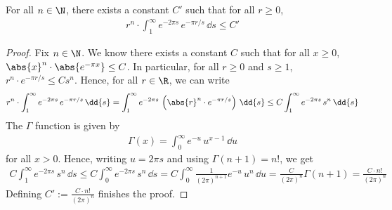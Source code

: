 \begin{lemma}\label{lem:integral-bound}\leanok
    For all $n \in \N$, there exists a constant $C'$ such that for all $r \geq 0$,
    \begin{align}
        r^n \cdot \int_{1}^{\infty} e^{-2\pi s} \, e^{-\pi r /s} \, \dd s \leq C'
    \end{align}
\end{lemma}
\begin{proof}\leanok
    Fix $n \in \N$. We know there exists a constant $C$ such that for all $x \geq 0$, $\abs{x}^n \cdot \abs{e^{-\pi x}} \leq C$. In particular, for all $r \geq 0$ and $s \geq 1$, $r^n \cdot e^{-\pi r/s} \leq C s^n$. Hence, for all $r \in \R$, we can write
    \begin{align}
        r^n \cdot \int_{1}^{\infty} e^{-2\pi s} \, e^{-\pi r /s} \, \dd{s}
        = \int_{1}^{\infty} e^{-2\pi s} \, \left(\abs{r}^n \cdot e^{-\pi r /s}\right) \, \dd{s}
        \leq C \int_{1}^{\infty} e^{-2\pi s} \, s^n \, \dd{s}
    \end{align}
    The $\Gamma$ function is given by
    \begin{align}
        \Gamma(x) = \int_{0}^{\infty} e^{-u} \, u^{x-1} \, \dd{u}
    \end{align}
    for all $x > 0$. Hence, writing $u = 2\pi s$ and using $\Gamma(n+1) = n!$, we get
    \begin{align}
        C \int_{1}^{\infty} e^{-2\pi s} \, s^n \, \dd{s}
        \leq C \int_{0}^{\infty} e^{-2\pi s} \, s^n \, \dd{s}
        = C \int_{0}^{\infty} \frac{1}{(2\pi)^{n+1}} e^{-u} \, u^n \, \dd{u}
        = \frac{C}{(2\pi)^n} \Gamma(n+1)
        = \frac{C \cdot n!}{(2\pi)^n}
    \end{align}
    Defining $C' := \frac{C \cdot n!}{(2\pi)^n}$ finishes the proof.
\end{proof}

